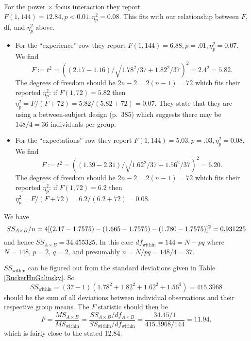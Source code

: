 For the power $\times$ focus interaction they report $F(1,144)=12.84, p<0.01, \eta_p^2=0.08$. This fits with our relationship between $F$, df, and $\eta_p^2$ above.
\begin{itemize}
\item For the ``experience'' row they report $F(1,144)=6.88, p=.01, \eta_p^2=0.07$.
We find
\[
	F:= t^2= \left((2.17-1.16)/\sqrt{1.78^2/37+1.82^2/37}\right)^2=2.4^2=5.82.
\]
The degrees of freedom should be $2n-2=2(n-1)=72$ which fits their reported $\eta_p^2$:
if $F(1,72)=5.82$ then $\eta^2_p=F/(F+72)=5.82/(5.82+72)=0.07$.
They state that they are using a between-subject design (p.~385) which suggests there may be $148/4=36$ individuals per group.
\item For the ``expectations'' row they report $F(1,144)=5.03, p=.03, \eta_p^2=0.08$.
We find
\[
	F:=t^2=\left((1.39-2.31)/\sqrt{1.62^2/37+1.56^2/37}\right)^2=6.20.
\]
The degrees of freedom should be $2n-2=2(n-1)=72$ which fits their reported $\eta_p^2$:
if $F(1,72)=6.2$ then $\eta^2_p=F/(F+72)=6.2/(6.2+72)=0.08$.
\end{itemize}
We have
\[
SS_{A\times B}/n=	4   [(2.17-1.7575)-(1.665-1.7575)-(1.780-1.7575)]^2\\
	=0.931225
\]
and hence $SS_{A\times B} = 34.455325$.
In this case $df_{\text{within}}=144=N-pq$ where $N=148$, $p=2$, $q=2$, and presumably $n=N/pq=148/4=37$.

$SS_{\text{within}}$ can be figured out from the standard deviations given in Table \ref{RuckerHuGalinsky}.
So
\[
	SS_{\text{within}}=(37-1)(1.78^2+1.82^2+1.62^2+1.56^2)=415.3968
\]
should be the sum of all deviations between individual observations and their respective group means.
The $F$ statistic should then be
\[
F=\frac{MS_{A\times B}}{MS_{\text{within}}}=\frac{SS_{A\times B}/df_{A\times B}}{SS_{\text{within}}/df_{\text{within}}}=\frac{34.45/1}{415.3968/144}=11.94.
\]
which is fairly close to the stated 12.84.
